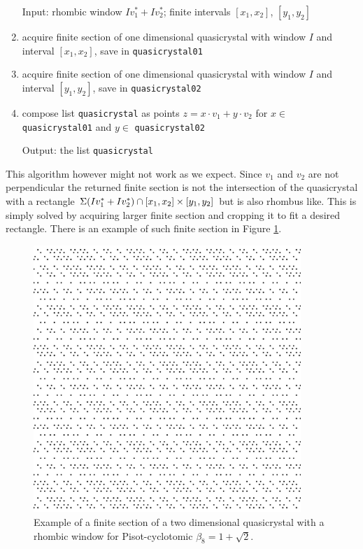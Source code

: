 \documentclass[text.tex]{subfiles}
\begin{document}
\begin{enumerate}
\item[Input:] rhombic window $Iv_1^\ast+Iv_2^\ast$; finite intervals $[x_1,x_2]$, $[y_1,y_2]$
\item acquire finite section of one dimensional quasicrystal with window $I$ and interval $[x_1,x_2]$, save in \texttt{quasicrystal01}
\item acquire finite section of one dimensional quasicrystal with window $I$ and interval $[y_1,y_2]$, save in \texttt{quasicrystal02}
\item compose list \texttt{quasicrystal} as points $z=x\cdot v_1+y\cdot v_2$ for $x\in$ \texttt{quasicrystal01} and $y\in$ \texttt{quasicrystal02}
\item[Output:] the list \texttt{quasicrystal}
\end{enumerate}

This algorithm however might not work as we expect. Since $v_1$ and $v_2$ are not perpendicular the returned finite section is not the intersection of the quasicrystal with a rectangle $\Sigma(Iv_1^\ast+Iv_2^\ast)\cap[x_1,x_2]\times[y_1,y_2]$ but is also rhombus like. This is simply solved by acquiring larger finite section and cropping it to fit a desired rectangle. There is an example of such finite section in Figure \ref{fig_quasicrystalExampleRhombus}. 

\begin{figure}[h!]
\centering
\includegraphics[width=0.9\textwidth]{img/2D/rhombus}
\caption{Example of a finite section of a two dimensional quasicrystal with a rhombic window for Pisot-cyclotomic $\beta_8=1+\sqrt{2}$.}
\label{fig_quasicrystalExampleRhombus}
\end{figure}
\end{document}
